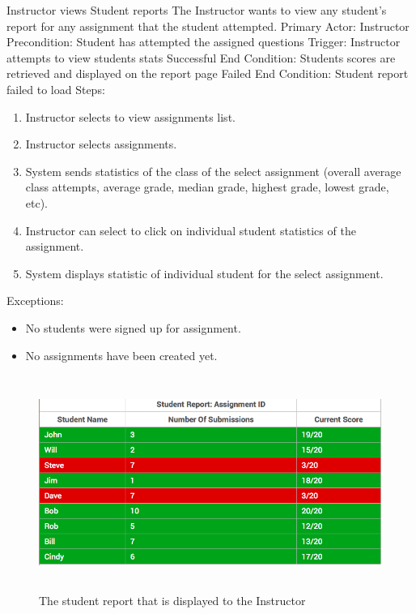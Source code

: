     \begin{section}{Instructor views Student reports}
		The Instructor wants to view any student's report for any assignment that the student attempted. \newline
		Primary Actor: Instructor \newline
		Precondition: Student has attempted the assigned questions \newline
		Trigger: Instructor attempts to view students stats \newline
		Successful End Condition: Students scores are retrieved and displayed on the report page \newline
		Failed End Condition: Student report failed to load \newline
		\newline
        Steps:
        \begin{enumerate}
            \item{Instructor selects to view assignments list.}
            \item{Instructor selects assignments.}
            \item{System sends statistics of the class of the select assignment (overall average class attempts, average grade, median grade, highest grade, lowest grade, etc).}
            \item{Instructor can select to click on individual student statistics of the assignment.}
			\item{System displays statistic of individual student for the select assignment.}
        \end{enumerate}
        Exceptions:
        \begin{itemize}
            \item{No students were signed up for assignment.}
			\item{No assignments have been created yet.}
        \end{itemize}
                        \begin{figure}[H]
            \centerline{\includegraphics[height=7cm]{StudentReport.jpg}}
            \caption{The student report that is displayed to the Instructor}
    \end{figure}
    \end{section}	
	

